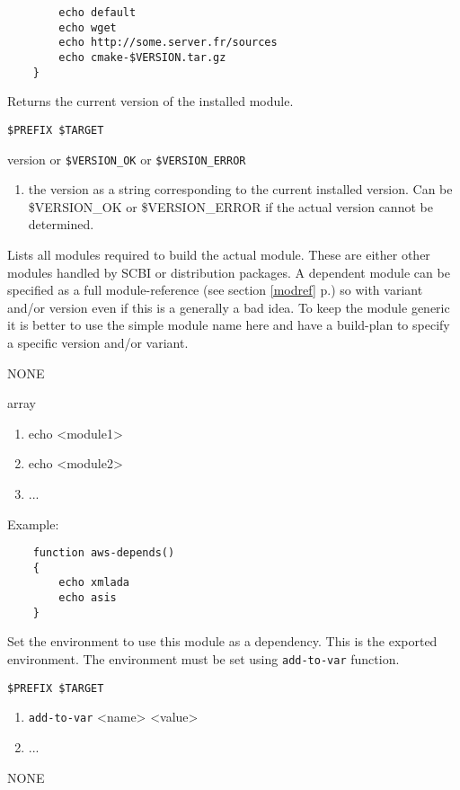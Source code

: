 \documentclass[a4paper,12pt,twoside]{article}
\newcommand{\code}[1]{\texttt{#1}}
\newcommand{\seeref}[1]{see section \ref{#1} p.\pageref{#1}}
\begin{document}
\begin{description}[font=\large\texttt]
\begin{lstlisting}
		echo default
		echo wget
		echo http://some.server.fr/sources
		echo cmake-$VERSION.tar.gz
	}
	\end{lstlisting}

	\item[<module>-version] Returns the current version of the installed module.

	\begin{description}[font=\textit,style=standard]
		\item[parameter] \tabto{2cm} \code{\$PREFIX \$TARGET}
		\item[return] \tabto{2cm} version or \code{\$VERSION\_OK} or \code{\$VERSION\_ERROR}
		\begin{enumerate}
			\item the version as a string corresponding to the current installed version. Can be \$VERSION\_OK or \$VERSION\_ERROR if the actual version cannot be determined.
		\end{enumerate}
	\end{description}

	\item[<module>-depends] Lists all modules required to build the actual module. These are either other modules handled by SCBI or distribution packages. A dependent module can be specified as a full module-reference (\seeref{modref}) so with variant and/or version even if this is a generally a bad idea. To keep the module generic it is better to use the simple module name here and have a build-plan to specify a specific version and/or variant.

	\begin{description}[font=\textit,style=standard]
		\item[parameter] \tabto{2cm} NONE
		\item[return] \tabto{2cm} array
		\begin{enumerate}
			\item echo <module1>
			\item echo <module2>
			\item ...
		\end{enumerate}
	\end{description}

	Example:
	\begin{lstlisting}
	function aws-depends()
	{
		echo xmlada
		echo asis
	}
	\end{lstlisting}

	\item[<module>-env] Set the environment to use this module as a dependency. This is the exported environment. The environment must be set using \code{add-to-var} function.
	\begin{description}[font=\textit,style=standard]
		\item[parameter] \tabto{2cm} \code{\$PREFIX \$TARGET}
		\begin{enumerate}
			\item \code{add-to-var} <name> <value>
			\item ...
		\end{enumerate}
		\item[return] \tabto{2cm} NONE
	\end{description}


\end{description}
\end{document}
